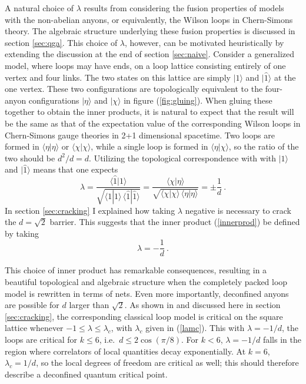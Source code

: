 \documentclass[11pt]{article}
\newcommand{\xxr}{|\widehat{1}\rangle}
\newcommand{\xxl}{\langle\widehat{1}}
\begin{document}
A natural choice of $\lambda$ results from considering the fusion
properties of models with the non-abelian anyons, or equivalently, the
Wilson loops in Chern-Simons theory. The algebraic structure
underlying these fusion properties is discussed in section
\ref{sec:qga}. This choice of $\lambda$, however, can be
motivated heuristically by extending the discussion at the end of
section \ref{sec:naive}. Consider a generalized model, where loops may
have ends, on a loop lattice consisting entirely of one vertex and
four links. The two states on this lattice are simply $|1\rangle$ and
$\xxr$ at the one vertex. These two configurations are topologically
equivalent to the four-anyon configurations $|\eta\rangle$ and
$|\chi\rangle$ in figure (\ref{fig:gluing}).  When gluing these
together to obtain the inner products, it is natural to expect that
the result will be the same as that of the expectation value of the
corresponding Wilson loops in Chern-Simons gauge theories in 2+1
dimensional spacetime. Two loops are formed in $\langle\eta
|\eta\rangle$ or $\langle\chi|\chi\rangle $, while a single loop is
formed in $\langle\eta |\chi \rangle$, so the ratio of the two should
be $d^2/d= d$. Utilizing the topological correspondence with with
$|1\rangle$ and $\xxr$ means that one expects
$$
\lambda =\frac{\xxl |1\rangle}{\sqrt{\langle 1|1\rangle\,\xxl\xxr}} =
\frac{\langle\chi|\eta\rangle}{\sqrt{\langle \chi|\chi\rangle\,
    \langle \eta|\eta\rangle }} = \pm \frac{1}{d} \ .
$$
In section \ref{sec:cracking} I explained how taking $\lambda$
negative is necessary to crack the $d=\sqrt{2}$ barrier. This suggests
that the inner product (\ref{innerprod}) be defined by taking
\begin{equation}
\lambda=-\frac{1}{d}\ .
\label{lamd}
\end{equation}


This choice of inner product has remarkable consequences, resulting in
a beautiful topological and algebraic structure when the completely
packed loop model is rewritten in terms of nets. Even more
importantly, deconfined anyons are possible for $d$ larger than
$\sqrt{2}$. As shown in \cite{FJ} and discussed here in section
\ref{sec:cracking}, the corresponding classical loop model is critical
on the square lattice whenever $-1\le \lambda\le \lambda_c$, with
$\lambda_c$ given in (\ref{lamc}). This with $\lambda=-1/d$, the
loops are critical for $k\le 6$, i.e.\ $d\le 2\cos(\pi/8)$.  For
$k<6$, $\lambda=-1/d$ falls in the region where correlators of local
quantities decay exponentially. At $k=6$, $\lambda_c=1/d$, so the
local degrees of freedom are critical as well; this should therefore
describe a deconfined quantum critical point.
\end{document}
